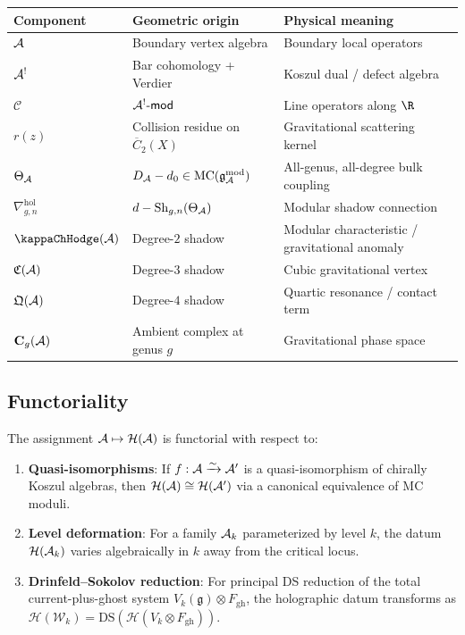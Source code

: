 \begin{center}
\renewcommand{\arraystretch}{1.35}
\small
\begin{tabular}{p{2.8cm}p{4.2cm}p{4.8cm}}
\textbf{Component}
 & \textbf{Geometric origin}
 & \textbf{Physical meaning} \\
\hline
$\mathcal{A}$
 & Boundary vertex algebra
 & Boundary local operators \\
$\mathcal{A}^!$
 & Bar cohomology + Verdier
 & Koszul dual / defect algebra \\
$\mathcal{C}$
 & $\mathcal{A}^!\text{-}\mathsf{mod}$
 & Line operators along $\R$ \\
$r(z)$
 & Collision residue on $\overline{C}_2(X)$
 & Gravitational scattering kernel \\
$\Theta_{\mathcal{A}}$
 & $D_{\mathcal{A}} - d_0 \in \mathrm{MC}(\mathfrak{g}_{\mathcal{A}}^{\mathrm{mod}})$
 & All-genus, all-degree bulk coupling \\
$\nabla^{\mathrm{hol}}_{g,n}$
 & $d - \operatorname{Sh}_{g,n}(\Theta_{\mathcal{A}})$
 & Modular shadow connection \\[4pt]
\hline
$\kappaChHodge(\cA)$
 & Degree-$2$ shadow
 & Modular characteristic / gravitational anomaly \\
$\mathfrak{C}(\mathcal{A})$
 & Degree-$3$ shadow
 & Cubic gravitational vertex \\
$\mathfrak{Q}(\mathcal{A})$
 & Degree-$4$ shadow
 & Quartic resonance / contact term \\
$\mathbf{C}_g(\mathcal{A})$
 & Ambient complex at genus $g$
 & Gravitational phase space \\
\end{tabular}
\end{center}


\subsection{Functoriality}

\begin{theorem}
The assignment $\mathcal{A} \mapsto \mathcal{H}(\mathcal{A})$ is functorial with
respect to:
\begin{enumerate}[label=\textup{(\roman*)}]
\item \textbf{Quasi-isomorphisms}: If $f: \mathcal{A} \xrightarrow{\sim} \mathcal{A}'$
 is a quasi-isomorphism of chirally Koszul algebras, then
 $\mathcal{H}(\mathcal{A}) \cong \mathcal{H}(\mathcal{A}')$ via a canonical
 equivalence of MC moduli.
\item \textbf{Level deformation}: For a family $\mathcal{A}_k$ parameterized
 by level $k$, the datum $\mathcal{H}(\mathcal{A}_k)$ varies algebraically
 in $k$ away from the critical locus.
\item \textbf{Drinfeld--Sokolov reduction}: For principal DS reduction
 of the total current-plus-ghost system
 $V_k(\mathfrak{g})\otimes F_{\mathrm{gh}}$,
 the holographic datum transforms as
 $\mathcal{H}(\mathcal{W}_k)
 = \mathrm{DS}(\mathcal{H}(V_k\otimes F_{\mathrm{gh}}))$.
\end{enumerate}
\end{theorem}


